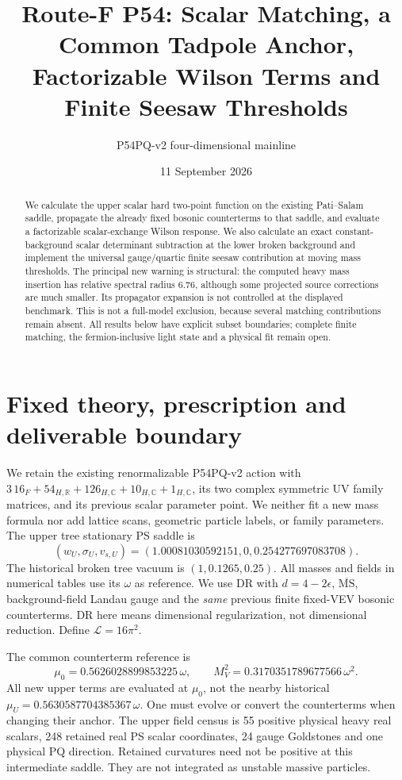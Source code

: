 \documentclass[11pt]{article}
\title{Route-F P54: Scalar Matching, a Common Tadpole Anchor,\\
Factorizable Wilson Terms and Finite Seesaw Thresholds}
\author{P54PQ-v2 four-dimensional mainline}
\date{11 September 2026}
\newcommand{\MS}{\overline{\mathrm{MS}}}
\newcommand{\LOOP}{\mathcal L}
\begin{document}
\maketitle
\begin{abstract}
We calculate the upper scalar hard two-point function on the existing
Pati--Salam saddle, propagate the already fixed bosonic counterterms to
that saddle, and evaluate a factorizable scalar-exchange Wilson response.
We also calculate an exact constant-background scalar determinant
subtraction at the lower broken background and implement the universal
gauge/quartic finite seesaw contribution at moving mass thresholds.
The principal new warning is structural: the computed heavy mass
insertion has relative spectral radius $6.76$, although some projected
source corrections are much smaller. Its propagator expansion is not
controlled at the displayed benchmark. This is not a full-model
exclusion, because several matching contributions remain absent.
All results below have explicit subset boundaries; complete finite
matching, the fermion-inclusive light state and a physical fit remain open.
\end{abstract}

\section{Fixed theory, prescription and deliverable boundary}
We retain the existing renormalizable P54PQ-v2 action with
$3\,16_F+54_{H,\mathbb R}+126_{H,\mathbb C}+10_{H,\mathbb C}
+1_{H,\mathbb C}$, its two complex symmetric UV family matrices, and its
previous scalar parameter point. We neither fit a new mass formula nor
add lattice scans, geometric particle labels, or family parameters.
The upper tree stationary PS saddle is
\begin{equation}
 (w_U,\sigma_U,v_{s,U})=(1.00081030592151,0,0.254277697083708).
 \label{eq:upper}
\end{equation}
The historical broken tree vacuum is $(1,0.1265,0.25)$. All masses and
fields in numerical tables use its $\omega$ as reference. We use DR with
$d=4-2\epsilon$, $\MS$, background-field Landau gauge and the \emph{same}
previous finite fixed-VEV bosonic counterterms. DR here means dimensional
regularization, not dimensional reduction. Define $\LOOP=16\pi^2$.

The common counterterm reference is
\begin{equation}
 \mu_0=0.5626028899853225\,\omega,
 \qquad M_V^2=0.3170351789677566\,\omega^2.
\end{equation}
All new upper terms are evaluated at $\mu_0$, not the nearby historical
$\mu_U=0.5630587704385367\,\omega$. One must evolve or convert the
counterterms when changing their anchor. The upper field census is
55 positive physical heavy real scalars, 248 retained real PS scalar
coordinates, 24 gauge Goldstones and one physical PQ direction.
Retained curvatures need not be positive at this intermediate saddle.
They are not integrated as unstable massive particles.
\end{document}
